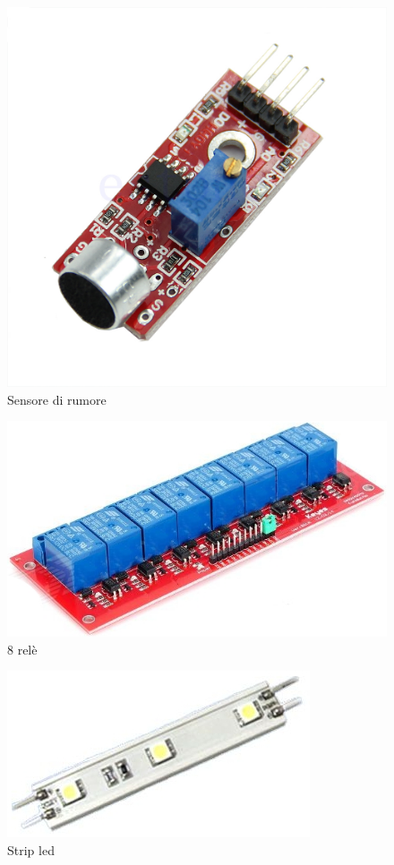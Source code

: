 \documentclass[a4paper,titlepage]{book}
\begin{document}
\begin{figure}[!ht]
\centering
\includegraphics[scale=0.2]{mic.jpg}
\caption{Sensore di rumore}
\end{figure}


\begin{figure}[!ht]
\centering
\includegraphics[scale=0.5]{rele.jpg}
\caption{8 relè}
\end{figure}

\begin{figure}[!ht]
\centering
\includegraphics[scale=0.5]{led.jpg}
\caption{Strip led}
\end{figure}
\end{document}
